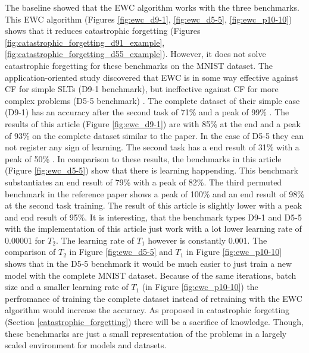 The baseline showed that the EWC algorithm works with the three benchmarks.
This EWC algorithm (Figures \ref{fig:ewc_d9-1}, \ref{fig:ewc_d5-5}, \ref{fig:ewc_p10-10}) shows that it reduces catastrophic forgetting (Figures \ref{fig:catastrophic_forgetting_d91_example}, \ref{fig:catastrophic_forgetting_d55_example}).
However, it does not solve catastrophic forgetting for these benchmarks on the MNIST dataset.
\newline
The application-oriented study \cite{cf_application_oriented_study} discovered that EWC is in some way effective against CF for simple SLTs (D9-1 benchmark), but ineffective against CF for more complex problems (D5-5 benchmark) \cite{cf_application_oriented_study}.
The complete dataset of their simple case (D9-1) has an accuracy after the second task of 71\% and a peak of 99\% \cite{cf_application_oriented_study}.
The results of this article (Figure \ref{fig:ewc_d9-1}) are with 85\% at the end and a peak of 93\% on the complete dataset similar to the paper.
In the case of D5-5 they can not register any sign of learning.
The second task has a end result of 31\% with a peak of 50\% \cite{cf_application_oriented_study}.
In comparison to these results, the benchmarks in this article (Figure \ref{fig:ewc_d5-5}) show that there is learning happending.
This benchmark substantiates an end result of 79\% with a peak of 82\%.
The third permuted benchmark in the reference paper \cite{cf_application_oriented_study} shows a peak of 100\% and an end result of 98\% at the second task training.
The result of this article is slightly lower with a peak and end result of 95\%.
\newline
It is interesting, that the benchmark types D9-1 and D5-5 with the implementation of this article just work with a lot lower learning rate of 0.00001 for $T_2$.
The learning rate of $T_1$ however is constantly 0.001.
\newline
The comparison of $T_2$ in Figure \ref{fig:ewc_d5-5} and $T_1$ in Figure \ref{fig:ewc_p10-10} shows that in the D5-5 benchmark it would be much easier to just train a new model with the complete MNIST dataset.
Because of the same iterations, batch size and a smaller learning rate of $T_1$ (in Figure \ref{fig:ewc_p10-10}) the perfromance of training the complete dataset instead of retraining with the EWC algorithm would increase the accuracy.
As proposed in catastrophic forgetting (Section \ref{catastrophic_forgetting}) there will be a sacrifice of knowledge.
Though, these benchmarks are just a small representation of the problems in a largely scaled environment for models and datasets.
